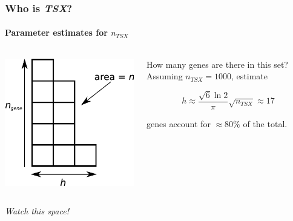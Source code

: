 \documentclass{beamer}
\begin{document}
\begin{frame}
    \frametitle{Who is \emph{TSX}?}
    \framesubtitle{Parameter estimates for $n_{TSX}$}

    \begin{columns}
        \begin{column}{0.5\textwidth}
        \includegraphics[width=\textwidth]{figures/Young_diagram}
        \end{column}
        \begin{column}{0.5\textwidth}
    How many genes are there in this set? Assuming $n_{TSX} = 1000$, estimate 

    \begin{equation*}
        h \approx \frac{\sqrt{6} \ln 2}{\pi} \sqrt{n_{TSX}} \approx 17
    \end{equation*}

    genes account for $\approx80\%$ of the total.
        \end{column}
    \end{columns}

    \;

    \begin{center}
        \emph{Watch this space!}
    \end{center}
    
\end{frame}
\end{document}
